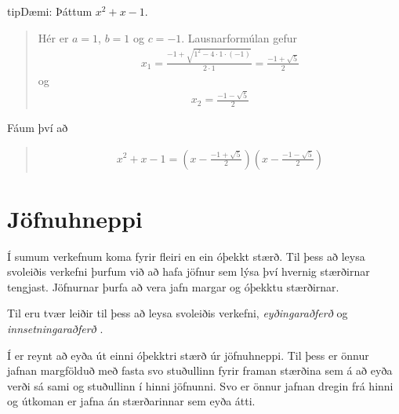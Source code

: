\documentclass[a4paper,10pt,icelandic]{sphinxmanual}
\begin{document}
\begin{sphinxadmonition}{tip}{Dæmi:}
 Þáttum \(x^2+x-1\).
\begin{quote}

Hér er \(a=1\), \(b=1\) og \(c=-1\). Lausnarformúlan gefur
\begin{equation*}
\begin{split}x_1=\frac{-1+\sqrt{1^2-4 \cdot 1 \cdot (-1)}}{2 \cdot 1}=\frac{-1+\sqrt{5}}{2}\end{split}
\end{equation*}
og
\begin{equation*}
\begin{split}x_2=\frac{-1-\sqrt{5}}{2}\end{split}
\end{equation*}\end{quote}
\end{sphinxadmonition}

Fáum því að
\begin{quote}
\begin{equation*}
\begin{split}x^2+x-1=\left(x-\frac{-1+\sqrt{5}}{2}\right)\left(x-\frac{-1-\sqrt{5}}{2}\right)\end{split}
\end{equation*}\end{quote}


\section{Jöfnuhneppi}
\label{\detokenize{Kafli02:jofnuhneppi}}
Í sumum verkefnum koma fyrir fleiri en ein óþekkt stærð.
Til þess að leysa svoleiðis verkefni þurfum við að hafa jöfnur sem lýsa því hvernig stærðirnar tengjast.
Jöfnurnar þurfa að vera jafn margar og óþekktu stærðirnar.

Til eru tvær leiðir til þess að leysa svoleiðis verkefni, \textit{eyðingaraðferð} og \textit{innsetningaraðferð} .

Í  er reynt að eyða út einni óþekktri stærð úr jöfnuhneppi.
Til þess er önnur jafnan margfölduð með fasta svo stuðullinn fyrir framan stærðina sem á að eyða verði sá sami og stuðullinn í hinni jöfnunni.
Svo er önnur jafnan dregin frá hinni og útkoman er jafna án stærðarinnar sem eyða átti.
\end{document}
